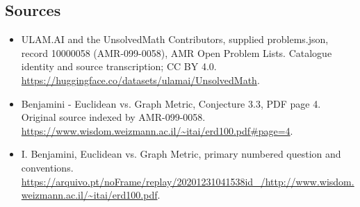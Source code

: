 \documentclass[11pt,a4paper]{article}
\begin{document}
\subsection{Sources}
\begin{itemize}
\item[S1] ULAM.AI and the UnsolvedMath Contributors, supplied problems.json, record 10000058 (AMR-099-0058), AMR Open Problem Lists. Catalogue identity and source transcription; CC BY 4.0.
\url{https://huggingface.co/datasets/ulamai/UnsolvedMath}.
\item[S2] Benjamini - Euclidean vs. Graph Metric, Conjecture 3.3, PDF page 4. Original source indexed by AMR-099-0058.
\url{https://www.wisdom.weizmann.ac.il/~itai/erd100.pdf#page=4}.
\item[S3] I. Benjamini, Euclidean vs. Graph Metric, primary numbered question and conventions.
\url{https://arquivo.pt/noFrame/replay/20201231041538id_/http://www.wisdom.weizmann.ac.il/~itai/erd100.pdf}.
\end{itemize}
\end{document}
